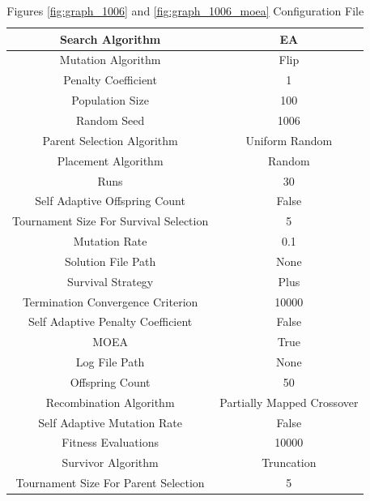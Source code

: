 \documentclass{standalone}
\begin{document}
\clearpage
\begin{table}[!htb]
	\centering
	\caption{Figures \ref{fig:graph_1006} and \ref{fig:graph_1006_moea} Configuration File}
	\label{tab:graph_1006}
	\begin{tabular}{| c | c |}
		\hline
		Search Algorithm		& EA		 \\
		\hline
		Mutation Algorithm		& Flip		 \\
		\hline
		Penalty Coefficient		& 1		 \\
		\hline
		Population Size		& 100		 \\
		\hline
		Random Seed		& 1006		 \\
		\hline
		Parent Selection Algorithm		& Uniform Random		 \\
		\hline
		Placement Algorithm		& Random		 \\
		\hline
		Runs		& 30		 \\
		\hline
		Self Adaptive Offspring Count		& False		 \\
		\hline
		Tournament Size For Survival Selection		& 5		 \\
		\hline
		Mutation Rate		& 0.1		 \\
		\hline
		Solution File Path		& None		 \\
		\hline
		Survival Strategy		& Plus		 \\
		\hline
		Termination Convergence Criterion		& 10000		 \\
		\hline
		Self Adaptive Penalty Coefficient		& False		 \\
		\hline
		MOEA		& True		 \\
		\hline
		Log File Path		& None		 \\
		\hline
		Offspring Count		& 50		 \\
		\hline
		Recombination Algorithm		& Partially Mapped Crossover		 \\
		\hline
		Self Adaptive Mutation Rate		& False		 \\
		\hline
		Fitness Evaluations		& 10000		 \\
		\hline
		Survivor Algorithm		& Truncation		 \\
		\hline
		Tournament Size For Parent Selection		& 5		 \\
		\hline
	\end{tabular}
\end{table}
\end{document}
